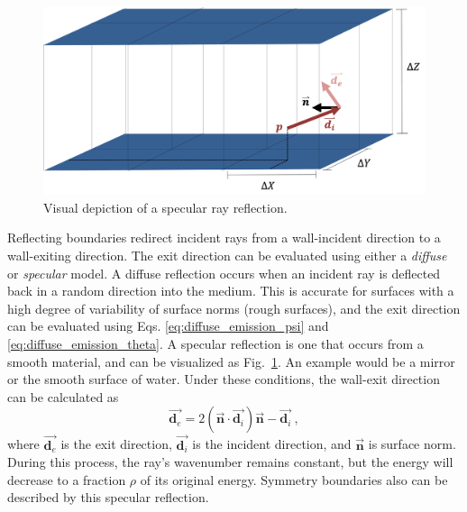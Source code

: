 \begin{figure}
\centering
\includegraphics[width=0.8\linewidth]{figures/ch3/SpecularReflection.png}
\caption{Visual depiction of a specular ray reflection. }
\label{fig:specularreflection}
\end{figure}

Reflecting boundaries redirect incident rays from a wall-incident direction to a wall-exiting direction. 
The exit direction can be evaluated using either a \textit{diffuse} or \textit{specular} model. 
A diffuse reflection occurs when an incident ray is deflected back in a random direction into the medium. This is accurate for surfaces with a high degree of variability of surface norms (rough surfaces), and the exit direction can be evaluated using Eqs. \ref{eq:diffuse_emission_psi} and \ref{eq:diffuse_emission_theta}.
A specular reflection is one that occurs from a smooth material, and can be visualized as Fig.~\ref{fig:specularreflection}. 
An example would be a mirror or the smooth surface of water. Under these conditions, the wall-exit direction can be calculated as
\begin{equation}
    \Vec{\textbf{d}_e}=2(\Vec{\textbf{n}}\cdot\Vec{\textbf{d}_i})\Vec{\textbf{n}} -\Vec{\textbf{d}_i}~,
    \label{eq:specular_reflection}
\end{equation}
where $\Vec{\textbf{d}_{e}}$ is the exit direction, $\Vec{\textbf{d}_i}$ is the incident direction, and $\vec{\textbf{n}}$ is surface norm. During this process, the ray's wavenumber remains constant, but the energy will decrease to a fraction $\rho$ of its original energy.
Symmetry boundaries also can be described by this specular reflection.



